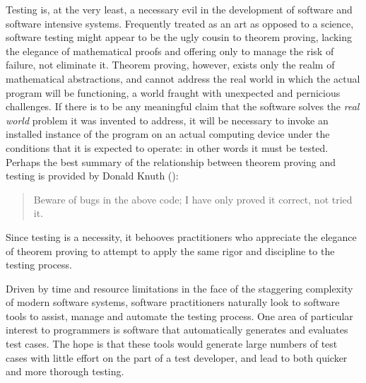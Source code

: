 
Testing is, at the very least, a necessary evil 
in the development of software and software intensive systems.
Frequently treated as an art as opposed to a science,
software testing might appear to be the ugly cousin to theorem proving,
lacking the elegance of mathematical proofs and
offering only to manage the risk of failure, not eliminate it.
Theorem proving, however, exists only the realm of mathematical abstractions,
and cannot address the real world in which the actual program will be functioning,
a world fraught with unexpected and pernicious challenges.
If there is to be any meaningful claim that
the software solves the \emph{real world} problem it was invented to address,
it will be necessary to invoke an installed instance of the program 
on an actual computing device under the conditions that it is expected to operate:
in other words it must be tested.
Perhaps the best summary of the relationship between theorem proving and testing 
is provided by Donald Knuth (\cite{KnuthProvedNotTested1977}):

\begin{quote}
Beware of bugs in the above code; I have only proved it correct, not tried it.
\end{quote}

\noindent
Since testing is a necessity, 
it behooves practitioners who appreciate the elegance of theorem proving
to attempt to apply the same rigor and discipline to the testing process.

Driven by time and resource limitations
in the face of the staggering complexity of modern software systems,
software practitioners naturally look to software tools
to assist, manage and automate the testing process.
One area of particular interest to programmers is 
software that automatically generates and evaluates test cases.
The hope is that these tools would generate large numbers of test cases
with little effort on the part of a test developer, 
and lead to both quicker and more thorough testing.

